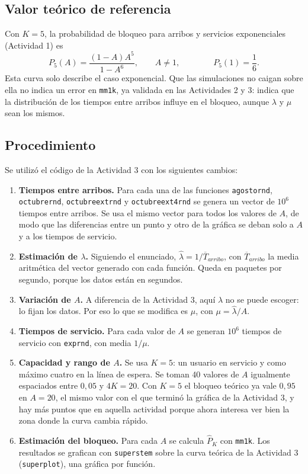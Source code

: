\documentclass[12pt]{article}
\begin{document}
\subsection{Valor teórico de referencia}
 
Con $K=5$, la probabilidad de bloqueo para arribos y servicios exponenciales (Actividad 1) es
\[
P_5(A)=\frac{(1-A)A^{5}}{1-A^{6}},\qquad A\neq 1,\qquad\qquad P_5(1)=\frac{1}{6}.
\]
Esta curva solo describe el caso exponencial. Que las simulaciones no caigan sobre ella no indica un error en \texttt{mm1k}, ya validada en las Actividades 2 y 3: indica que la distribución de los tiempos entre arribos influye en el bloqueo, aunque $\lambda$ y $\mu$ sean los mismos.
 
\subsection{Procedimiento}
 
Se utilizó el código de la Actividad 3 con los siguientes cambios:
 
\begin{enumerate}
    \item \textbf{Tiempos entre arribos.} Para cada una de las funciones \texttt{agostornd}, \texttt{octubrernd}, \texttt{octubreextrnd} y \texttt{octubreext4rnd} se genera un vector de $10^6$ tiempos entre arribos. Se usa el mismo vector para todos los valores de $A$, de modo que las diferencias entre un punto y otro de la gráfica se deban solo a $A$ y a los tiempos de servicio.
    \item \textbf{Estimación de $\lambda$.} Siguiendo el enunciado, $\hat{\lambda}=1/\overline{T}_{arribo}$, con $\overline{T}_{arribo}$ la media aritmética del vector generado con cada función. Queda en paquetes por segundo, porque los datos están en segundos.
    \item \textbf{Variación de $A$.} A diferencia de la Actividad 3, aquí $\lambda$ no se puede escoger: lo fijan los datos. Por eso lo que se modifica es $\mu$, con $\mu=\hat{\lambda}/A$.
    \item \textbf{Tiempos de servicio.} Para cada valor de $A$ se generan $10^6$ tiempos de servicio con \texttt{exprnd}, con media $1/\mu$.
    \item \textbf{Capacidad y rango de $A$.} Se usa $K=5$: un usuario en servicio y como máximo cuatro en la línea de espera. Se toman 40 valores de $A$ igualmente espaciados entre $0{,}05$ y $4K=20$. Con $K=5$ el bloqueo teórico ya vale $0{,}95$ en $A=20$, el mismo valor con el que terminó la gráfica de la Actividad 3, y hay más puntos que en aquella actividad porque ahora interesa ver bien la zona donde la curva cambia rápido.
    \item \textbf{Estimación del bloqueo.} Para cada $A$ se calcula $\hat{P}_K$ con \texttt{mm1k}. Los resultados se grafican con \texttt{superstem} sobre la curva teórica de la Actividad 3 (\texttt{superplot}), una gráfica por función.
\end{enumerate}
 
\end{document}
